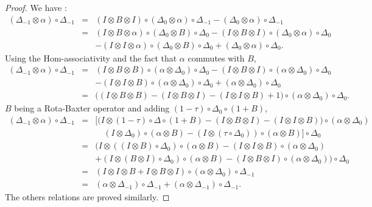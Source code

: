 \documentclass{article}
\theoremstyle{definition}
\theoremstyle{remark}
\numberwithin{equation}{section}
\begin{document}
\begin{proof}
 We have :
\begin{eqnarray}
 (\Delta_{-1}\otimes\alpha)\circ\Delta_{-1}
&=&(I\otimes B\otimes I)\circ(\Delta_0\otimes\alpha)\circ\Delta_{-1}-(\Delta_0\otimes\alpha)\circ\Delta_{-1}\nonumber\\
&=&(I\otimes B\otimes\alpha)\circ(\Delta_0\otimes B)\circ\Delta_0-(I\otimes B\otimes I)\circ(\Delta_0\otimes\alpha)\circ\Delta_0\nonumber\\
&&-(I\otimes I\otimes\alpha)\circ(\Delta_0\otimes B)\circ\Delta_0+(\Delta_0\otimes\alpha)\circ\Delta_0\nonumber.
\end{eqnarray}
Using the Hom-associativity and the fact that $\alpha$ commutes with $B$,
\begin{eqnarray}
 (\Delta_{-1}\otimes\alpha)\circ\Delta_{-1}
&=&(I\otimes B\otimes B)\circ(\alpha\otimes\Delta_0)\circ\Delta_0-(I\otimes B\otimes I)\circ(\alpha\otimes\Delta_0)\circ\Delta_0\nonumber\\
&&-(I\otimes I\otimes B)\circ(\alpha\otimes\Delta_0)\circ\Delta_0+(\alpha\otimes\Delta_0)\circ\Delta_0\nonumber\\
&=&\Big( (I\otimes B\otimes B)-(I\otimes B\otimes I)-(I\otimes I\otimes B)+ 1 \Big)\circ(\alpha\otimes\Delta_0)\circ\Delta_0\nonumber.
\end{eqnarray}
$B$ being a Rota-Baxter operator and adding $(1-\tau)\circ\Delta_0\circ(1+B)$,
\begin{eqnarray}
(\Delta_{-1}\otimes\alpha)\circ\Delta_{-1}&=&\Big[\Big(I\otimes(1-\tau)\circ\Delta\circ(1+B)-(I\otimes B\otimes I)-(I\otimes I\otimes B)\Big)\circ(\alpha\otimes\Delta_0)\nonumber\\
&&\quad(I\otimes \Delta_0)\circ(\alpha\otimes B)-(I\otimes(\tau\circ\Delta_0))\circ(\alpha\otimes B)\Big]\circ\Delta_0\nonumber\\
&=&\Big(I\otimes((I\otimes B)\circ\Delta_0)\circ(\alpha\otimes B)-(I\otimes I\otimes B)\circ(\alpha\otimes\Delta_0)\nonumber\\
&&+(I\otimes(B\otimes I)\circ\Delta_0)\circ(\alpha\otimes B)-(I\otimes B\otimes I)\circ(\alpha\otimes\Delta_0)\Big)\circ\Delta_0\nonumber\\
&=&(I\otimes I\otimes B+I\otimes B\otimes I)\circ(\alpha\otimes\Delta_0)\circ\Delta_{-1}\nonumber\\
&=&(\alpha\otimes\Delta_{-1})\circ\Delta_{-1}+(\alpha\otimes\Delta_{-1})\circ\Delta_{-1}.\nonumber
\end{eqnarray}
The others relations are proved similarly.
\end{proof}
\end{document}
